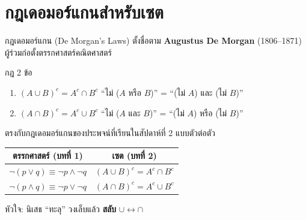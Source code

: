 \section{กฎเดอมอร์แกนสำหรับเซต}

\begin{frame}{กฎเดอมอร์แกน (De Morgan's Laws)}
  ตั้งชื่อตาม \textbf{Augustus De Morgan} (1806--1871) ผู้ร่วมก่อตั้งตรรกศาสตร์คณิตศาสตร์
  \begin{block}{กฎ 2 ข้อ}
    \begin{enumerate}
      \item $(A \cup B)^c = A^c \cap B^c$ \hfill ``ไม่ ($A$ หรือ $B$)'' = ``(ไม่ $A$) และ (ไม่ $B$)''
      \item $(A \cap B)^c = A^c \cup B^c$ \hfill ``ไม่ ($A$ และ $B$)'' = ``(ไม่ $A$) หรือ (ไม่ $B$)''
    \end{enumerate}
  \end{block}
  \vspace{0.3em}
  ตรงกับกฎเดอมอร์แกนของประพจน์ที่เรียนในสัปดาห์ที่ 2 แบบตัวต่อตัว
  \begin{center}\small
  \begin{tabular}{|c|c|}
    \hline
    \textbf{ตรรกศาสตร์ (บทที่ 1)} & \textbf{เซต (บทที่ 2)} \\ \hline
    $\neg(p \lor q) \equiv \neg p \land \neg q$ & $(A \cup B)^c = A^c \cap B^c$ \\ \hline
    $\neg(p \land q) \equiv \neg p \lor \neg q$ & $(A \cap B)^c = A^c \cup B^c$ \\ \hline
  \end{tabular}
  \end{center}
  \vspace{0.2em}
  \footnotesize หัวใจ: นิเสธ ``ทะลุ'' วงเล็บแล้ว \textbf{สลับ} $\cup \leftrightarrow \cap$
\end{frame}

